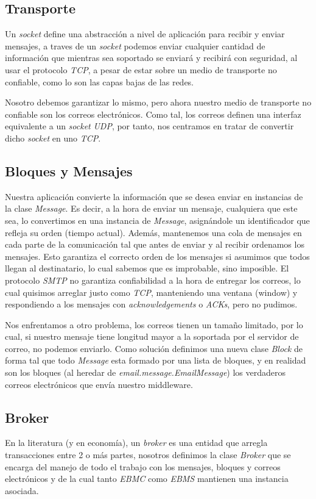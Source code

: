 \documentclass[a4paper]{article}
\begin{document}
	\subsection{Transporte}
	Un \emph{socket} define una abstracción a nivel de aplicación para recibir y enviar mensajes, a traves de un \emph{socket} podemos enviar cualquier cantidad de información que mientras sea soportado se enviará y recibirá con seguridad, al usar el protocolo \emph{TCP}, a pesar de estar sobre un medio de transporte no confiable, como lo son las capas bajas de las redes.
	
	Nosotro debemos garantizar lo mismo, pero ahora nuestro medio de transporte no confiable son los correos electrónicos. Como tal, los correos definen una interfaz equivalente a un \emph{socket} \emph{UDP}, por tanto, nos centramos en tratar de convertir dicho \emph{socket} en uno \emph{TCP}.
	
	\subsection{Bloques y Mensajes}
	Nuestra aplicación convierte la información que se desea enviar en instancias de la clase \emph{Message}.
	Es decir, a la hora de enviar un mensaje, cualquiera que este sea, lo convertimos en una instancia de \emph{Message}, asignándole un identificador que refleja su orden (tiempo actual). Además, mantenemos una cola de mensajes en cada parte de la comunicación tal que antes de enviar y al recibir ordenamos los mensajes. Esto garantiza el correcto orden de los mensajes si asumimos que todos llegan al destinatario, lo cual sabemos que es improbable, sino imposible. El protocolo \emph{SMTP} no garantiza confiabilidad a la hora de entregar los correos, lo cual quisimos arreglar justo como \emph{TCP}, manteniendo una ventana (window) y respondiendo a los mensajes con \emph{acknowledgements} o \emph{ACKs}, pero no pudimos.
	
	Nos enfrentamos a otro problema, los correos tienen un tamaño limitado, por lo cual, si nuestro mensaje tiene longitud mayor a la soportada por el servidor de correo, no podemos enviarlo. Como solución definimos una nueva clase \emph{Block} de forma tal que todo \emph{Message} esta formado por una lista de bloques, y en realidad son los bloques (al heredar de \emph{email.message.EmailMessage}) los verdaderos correos electrónicos que envía nuestro middleware.
	
	\subsection{Broker}
	En la literatura (y en economía), un \emph{broker} es una entidad que arregla transacciones entre 2 o más partes, nosotros definimos la clase \emph{Broker} que se encarga del manejo de todo el trabajo con los mensajes, bloques y correos electrónicos y de la cual tanto \emph{EBMC} como \emph{EBMS} mantienen una instancia asociada.
	
\end{document}
